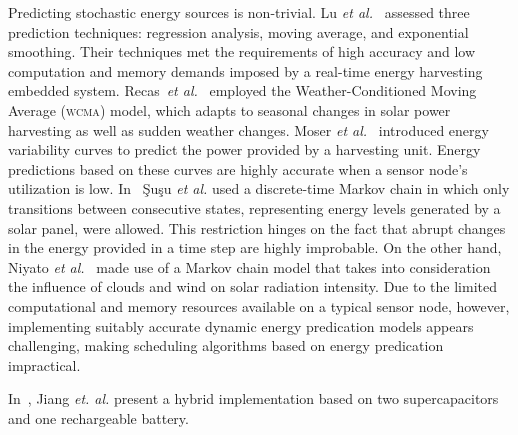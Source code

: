 Predicting stochastic energy sources is non-trivial.
Lu \emph{et al.}~\cite{lu2010accurate} assessed three prediction techniques: regression analysis,
moving average, and exponential smoothing.  Their techniques met the requirements of high accuracy and low computation and memory demands imposed by a real-time energy
harvesting embedded system.
Recas~\emph{et al.}~\cite{recas2000hollows} employed the Weather-Conditioned Moving Average (\textsc{wcma}) model,
which adapts to seasonal changes in solar power harvesting as well as sudden weather changes.
Moser \emph{et al.}~\cite{moser2007real} introduced energy variability curves to predict the power provided by a
harvesting unit. Energy predictions based on these curves are highly accurate when a sensor node's utilization is low.
In~\cite{susu2008stochastic} \c{S}u\c{s}u \emph{et al.} used a discrete-time Markov chain in which only transitions between
consecutive states, representing energy levels generated by a solar panel, were allowed. This restriction hinges
on the fact that abrupt changes in the energy provided in a time step are highly improbable.
On the other hand, Niyato \emph{et al.}~\cite{niyato2007sleep} made use of a Markov chain model that takes into
consideration the influence of clouds and wind on solar radiation intensity.
Due to the limited computational and memory resources available on a typical sensor node, however,
implementing suitably accurate dynamic energy predication models appears challenging, making
scheduling algorithms based on energy predication impractical.

In~\cite{jiang2005perpetual}, Jiang \emph{et. al.} present a hybrid implementation based on two supercapacitors and one rechargeable battery.